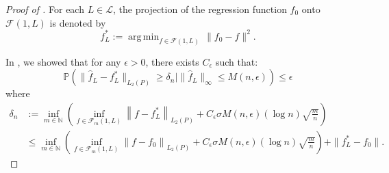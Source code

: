\documentclass[12pt]{article}
\DeclareMathOperator*{\argmin}{arg\,min}
\begin{document}
\begin{appendices}
\begin{proof}[Proof of ]
 For each $L \in \mathcal{L}$, the projection of the regression function $f_0$ onto $\mathcal{F}(1,L)$ is denoted by
\begin{equation}\label{eq:fixed-L-oracle}
    f_L^* := \argmin_{f \in \mathcal{F}(1,L)}\, \|f_0 - f\|^2.
\end{equation}

In , we showed that for any $\epsilon >0$, there exists $C_\epsilon$ such that:
\begin{equation*}
\mathbb{P}\left(\|\widehat{f}_L-f_L^*\|_{L_2(P)} \geq \delta_n \mid\|\widehat{f}_L\|_{\infty} \leq M(n,\epsilon)\right) \leq \epsilon
\end{equation*}
where
\begin{equation*}
\begin{aligned}
  \delta_n &:=\inf _{m \in \mathbb{N}}\left(\inf _{f \in \mathcal{F}_m(1, L)}\left\|f-f_L^*\right\|_{L_2(P)}+C_\epsilon \sigma M(n,\epsilon) (\log n) \sqrt{\frac{m}{n}}\right)\\
  & \leq  \inf _{m \in \mathbb{N}}\left(\inf _{f \in \mathcal{F}_m(1, L)}\left\|f-f_0\right\|_{L_2(P)}+C_\epsilon \sigma M(n, \epsilon) (\log n) \sqrt{\frac{m}{n}}\right)+ \|f_L^* - f_0\|.
\end{aligned}
\end{equation*}


\end{proof}
\end{appendices}
\end{document}
